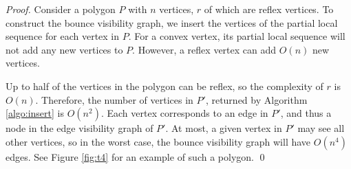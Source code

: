 \documentclass[]{styles/svproc}  %
\begin{document}
\begin{proof}

Consider a polygon $P$ with $n$ vertices, $r$ of which are reflex vertices. To
construct the bounce visibility graph, we insert the vertices of the partial
local sequence for each vertex in $P$. For a convex vertex, its partial local sequence 
will not add any new vertices to $P$. However, a reflex vertex can add $O(n)$ new vertices. 

Up to half of the vertices in the polygon can be reflex, so the complexity of
$r$ is $O(n)$. Therefore, the number of vertices in $P'$, returned by Algorithm
\ref{algo:insert} is $O(n^2)$. Each vertex corresponds to an edge in $P'$, and
thus a node in the edge visibility graph of $P'$. At most, a given vertex in $P'$ may see all other vertices, so in the worst
case, the bounce visibility graph will have $O(n^4)$ edges. See Figure
\ref{fig:t4} for an example of such a polygon.
\qed

\end{proof}

%
%
\end{document}
